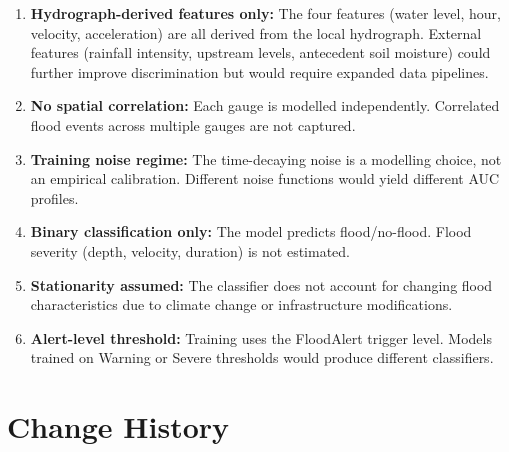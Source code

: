 \documentclass[11pt,a4paper]{article}
\begin{document}
\mkmlimitations

\begin{enumerate}[nosep]
    \item \textbf{Hydrograph-derived features only:} The four features (water level,
          hour, velocity, acceleration) are all derived from the local hydrograph.
          External features (rainfall intensity, upstream levels, antecedent
          soil moisture) could further improve discrimination but would require
          expanded data pipelines.
    \item \textbf{No spatial correlation:} Each gauge is modelled independently.
          Correlated flood events across multiple gauges are not captured.
    \item \textbf{Training noise regime:} The time-decaying noise is a modelling
          choice, not an empirical calibration. Different noise functions would
          yield different AUC profiles.
    \item \textbf{Binary classification only:} The model predicts flood/no-flood.
          Flood severity (depth, velocity, duration) is not estimated.
    \item \textbf{Stationarity assumed:} The classifier does not account for
          changing flood characteristics due to climate change or infrastructure
          modifications.
    \item \textbf{Alert-level threshold:} Training uses the FloodAlert trigger
          level. Models trained on Warning or Severe thresholds would produce
          different classifiers.
\end{enumerate}

\section{Change History}
\end{document}
